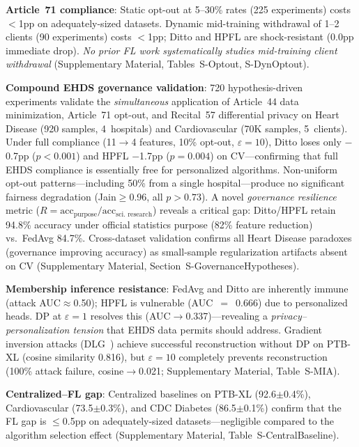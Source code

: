 \documentclass[conference]{IEEEtran}
\begin{document}
\textbf{Article~71 compliance}: Static opt-out at 5--30\% rates (225 experiments) costs $<$1pp on adequately-sized datasets. Dynamic mid-training withdrawal of 1--2 clients (90 experiments) costs $<$1pp; Ditto and HPFL are shock-resistant (0.0pp immediate drop). \textit{No prior FL work systematically studies mid-training client withdrawal} (Supplementary Material, Tables~S-Optout, S-DynOptout).

\textbf{Compound EHDS governance validation}: 720 hypothesis-driven experiments validate the \textit{simultaneous} application of Article~44 data minimization, Article~71 opt-out, and Recital~57 differential privacy on Heart Disease (920 samples, 4~hospitals) and Cardiovascular (70K samples, 5~clients). Under full compliance (11$\to$4 features, 10\% opt-out, $\varepsilon{=}10$), Ditto loses only $-$0.7pp ($p{<}0.001$) and HPFL $-$1.7pp ($p{=}0.004$) on CV---confirming that full EHDS compliance is essentially free for personalized algorithms. Non-uniform opt-out patterns---including 50\% from a single hospital---produce no significant fairness degradation (Jain$\geq$0.96, all $p{>}0.73$). A novel \textit{governance resilience} metric ($R = \text{acc}_{\text{purpose}} / \text{acc}_{\text{sci.\ research}}$) reveals a critical gap: Ditto/HPFL retain 94.8\% accuracy under official statistics purpose (82\% feature reduction) vs.\ FedAvg 84.7\%. Cross-dataset validation confirms all Heart Disease paradoxes (governance improving accuracy) as small-sample regularization artifacts absent on CV (Supplementary Material, Section~S-GovernanceHypotheses).

\textbf{Membership inference resistance}: FedAvg and Ditto are inherently immune (attack AUC$\approx$0.50); HPFL is vulnerable (AUC~$=$~0.666) due to personalized heads. DP at $\varepsilon{=}1$ resolves this (AUC$\to$0.337)---revealing a \textit{privacy--personalization tension} that EHDS data permits should address. Gradient inversion attacks (DLG~\cite{zhu2019deep}) achieve successful reconstruction without DP on PTB-XL (cosine similarity 0.816), but $\varepsilon{=}10$ completely prevents reconstruction (100\% attack failure, cosine$\to$0.021; Supplementary Material, Table~S-MIA).

\textbf{Centralized--FL gap}: Centralized baselines on PTB-XL (92.6$\pm$0.4\%), Cardiovascular (73.5$\pm$0.3\%), and CDC Diabetes (86.5$\pm$0.1\%) confirm that the FL gap is $\leq$0.5pp on adequately-sized datasets---negligible compared to the algorithm selection effect (Supplementary Material, Table~S-CentralBaseline).
\end{document}
